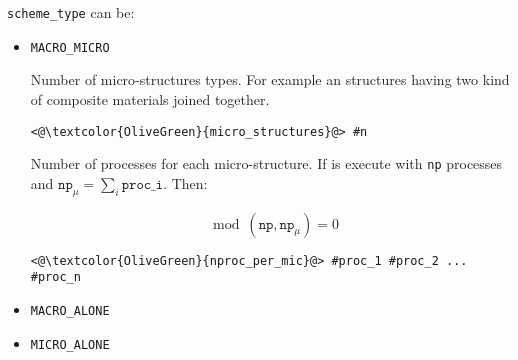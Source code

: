 \texttt{scheme\_type} can be:

\begin{itemize}
\item \texttt{MACRO_MICRO}

Number of micro-structures types. For example an structures having two kind of composite materials
joined together.

\begin{lstlisting}[frame=single]
     <@\textcolor{OliveGreen}{micro_structures}@> #n
\end{lstlisting}

Number of processes for each micro-structure. If \micro is execute with \texttt{np} processes and $\texttt{np}_{\mu} =
\sum_{i} \texttt{proc_{i}}$. Then:

$$\mod{(\texttt{np} ,\texttt{np}_{\mu})} = 0$$

\begin{lstlisting}[frame=single]
     <@\textcolor{OliveGreen}{nproc_per_mic}@> #proc_1 #proc_2 ... #proc_n
\end{lstlisting}

\item \texttt{MACRO_ALONE}   
\item \texttt{MICRO_ALONE}    
\end{itemize}




